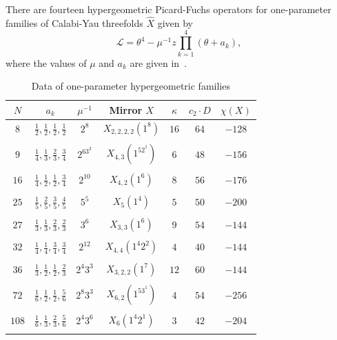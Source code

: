 \documentclass[10pt]{amsart}
\theoremstyle{definition}
\theoremstyle{remark}
\theoremstyle{plain}
\theoremstyle{definition}
\theoremstyle{remark}
\newcommand{\mc}[1]{\mathcal{#1}}
\newcommand{\1}{\mathbf{1}}
\newcommand{\2}{\mathbf{2}}
\newcommand{\3}{\mathbf{3}}
\begin{document}
There are fourteen hypergeometric Picard-Fuchs operators for one-parameter families of Calabi-Yau threefolds $\hat{X}$ given by
\[ \mc{L} = \theta^4 - \mu^{-1}z \prod_{k=1}^4 (\theta + a_k), \]
where the values of $\mu$ and $a_k$ are given in~.
\begin{table}[htpb]
    \centering
    \caption{Data of one-parameter hypergeometric families}
    \label{tab:oneparameter}
    \begin{tabular}{ccccccc}
        \toprule
        $N$ & $a_k$ & $\mu^{-1}$ & Mirror $X$ & $\kappa$ & $c_2 \cdot D$ & $\chi(X)$ \\
        \midrule
        $8$ & $\frac{1}{2},\frac{1}{2},\frac{1}{2},\frac{1}{2}$ & $2^8$ & $X_{2,2,2,2}(1^8)$ & $16$ & $64$ & $-128$ \\
        \\[-0.8em]
        $9$ & $\frac{1}{4},\frac{1}{3},\frac{2}{3},\frac{3}{4}$ & $2^63^3$ & $X_{4,3}(1^52^1)$ & $6$ & $48$ & $-156$ \\
        \\[-0.8em]
        $16$ & $\frac{1}{4},\frac{1}{2},\frac{1}{2},\frac{3}{4}$ & $2^{10}$ & $X_{4,2}(1^6)$ & $8$ & $56$ & $-176$ \\
        \\[-0.8em]
        $25$ & $\frac{1}{5},\frac{2}{5},\frac{3}{5},\frac{4}{5}$ & $5^5$ & $X_{5}(1^4)$ & $5$ & $50$ & $-200$ \\
        \\[-0.8em]
        $27$ & $\frac{1}{3},\frac{1}{3},\frac{2}{3},\frac{2}{3}$ & $3^6$ & $X_{3,3}(1^6)$ & $9$ & $54$ & $-144$ \\
        \\[-0.8em]
        $32$ & $\frac{1}{4},\frac{1}{4},\frac{3}{4},\frac{3}{4}$ & $2^{12}$ & $X_{4,4}(1^4 2^2)$ & $4$ & $40$ & $-144$ \\
        \\[-0.8em]
        $36$ & $\frac{1}{3},\frac{1}{2},\frac{1}{2},\frac{2}{3}$ & $2^4 3^3$ & $X_{3,2,2}(1^7)$ & $12$ & $60$ & $-144$ \\
        \\[-0.8em]
        $72$ & $\frac{1}{6},\frac{1}{2},\frac{1}{2},\frac{5}{6}$ & $2^{8}3^3$ & $X_{6,2}(1^53^1)$ & $4$ & $54$ & $-256$ \\
        \\[-0.8em]
        $108$ & $\frac{1}{6},\frac{1}{3},\frac{2}{3},\frac{5}{6}$ & $2^{4}3^6$ & $X_6(1^4 2^1)$ & $3$ & $42$ & $-204$ \\
        \\[-0.8em]

\end{tabular}
\end{table}
\end{document}
